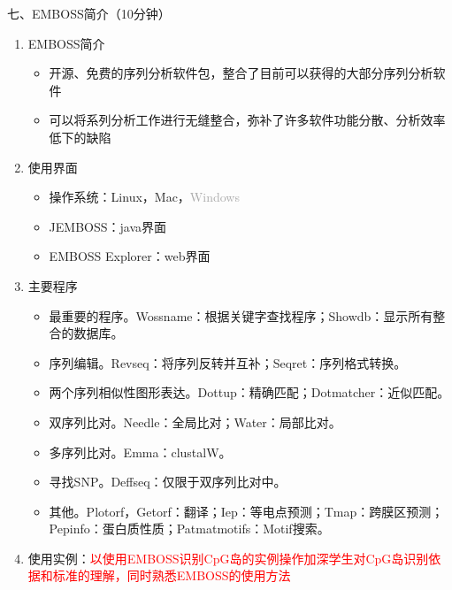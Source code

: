 \documentclass{TIJMUjiaoanLL}
\begin{document}
\vspace*{0.2cm}
\noindent
七、EMBOSS简介（10分钟）
\begin{enumerate}
  \item EMBOSS简介
    \begin{itemize}
      \item 开源、免费的序列分析软件包，整合了目前可以获得的大部分序列分析软件
      \item 可以将系列分析工作进行无缝整合，弥补了许多软件功能分散、分析效率低下的缺陷
    \end{itemize}
  \item 使用界面
    \begin{itemize}
      \item 操作系统：Linux，Mac，\textcolor{darkgray}{Windows}
      \item JEMBOSS：java界面
      \item EMBOSS Explorer：web界面
    \end{itemize}
  \item 主要程序
    \begin{itemize}
      \item 最重要的程序。Wossname：根据关键字查找程序；Showdb：显示所有整合的数据库。
      \item 序列编辑。Revseq：将序列反转并互补；Seqret：序列格式转换。
      \item 两个序列相似性图形表达。Dottup：精确匹配；Dotmatcher：近似匹配。
      \item 双序列比对。Needle：全局比对；Water：局部比对。
      \item 多序列比对。Emma：clustalW。
      \item 寻找SNP。Deffseq：仅限于双序列比对中。
      \item 其他。Plotorf，Getorf：翻译；Iep：等电点预测；Tmap：跨膜区预测；Pepinfo：蛋白质性质；Patmatmotifs：Motif搜索。
    \end{itemize}
  \item 使用实例：\textcolor{red}{以使用EMBOSS识别CpG岛的实例操作加深学生对CpG岛识别依据和标准的理解，同时熟悉EMBOSS的使用方法}
\end{enumerate}
\end{document}
